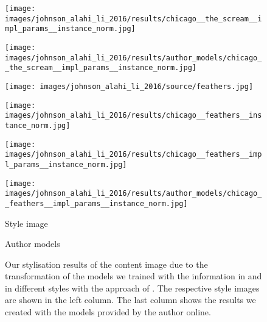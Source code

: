 \begin{figure}[H]
\begin{minipage}[t]{0.24\textwidth}
	\end{minipage}
	\hfill%
	\begin{minipage}[t]{0.24\textwidth}
		\centering
		\texttt{[image: images/johnson\_alahi\_li\_2016/results/chicago\_\_the\_scream\_\_impl\_params\_\_instance\_norm.jpg]}
	\end{minipage}
	\hfill%
	\begin{minipage}[t]{0.24\textwidth}
		\centering
		\texttt{[image: images/johnson\_alahi\_li\_2016/results/author\_models/chicago\_\_the\_scream\_\_impl\_params\_\_instance\_norm.jpg]}
	\end{minipage}
    \hfill%
    \begin{minipage}[t]{0.24\textwidth}
    	\centering
    	\texttt{[image: images/johnson\_alahi\_li\_2016/source/feathers.jpg]}
    \end{minipage}
    \hfill%
    \begin{minipage}[t]{0.24\textwidth}
    	\centering
    	\texttt{[image: images/johnson\_alahi\_li\_2016/results/chicago\_\_feathers\_\_instance\_norm.jpg]}
    \end{minipage}
    \hfill%
    \begin{minipage}[t]{0.24\textwidth}
    	\centering
    	\texttt{[image: images/johnson\_alahi\_li\_2016/results/chicago\_\_feathers\_\_impl\_params\_\_instance\_norm.jpg]}
    \end{minipage}
    \hfill%
    \begin{minipage}[t]{0.24\textwidth}
    	\centering
    	\texttt{[image: images/johnson\_alahi\_li\_2016/results/author\_models/chicago\_\_feathers\_\_impl\_params\_\_instance\_norm.jpg]}
    \end{minipage}
	\hfill%
	\begin{minipage}[t]{0.24\textwidth}
		\centering
		Style image
	\end{minipage}
	\hfill%
	\begin{minipage}[t]{0.24\textwidth}
		\centering
		\paper{}
	\end{minipage}
	\hfill%
	\begin{minipage}[t]{0.24\textwidth}
		\centering
		\implementation{}
	\end{minipage}
	\hfill%
	\begin{minipage}[t]{0.24\textwidth}
		\centering
		Author models
	\end{minipage}
	\caption{Our stylisation results of the content image due to the transformation of the models we trained with the information in \paper{} and \implementation{} in different styles with the approach of  \cite{JAL2016}. The respective style images are shown in the left column. The last column shows the results we created with the models provided by the author online.}
	\label{fig:johnson_alahi_li_2016_fig}
\end{figure}

